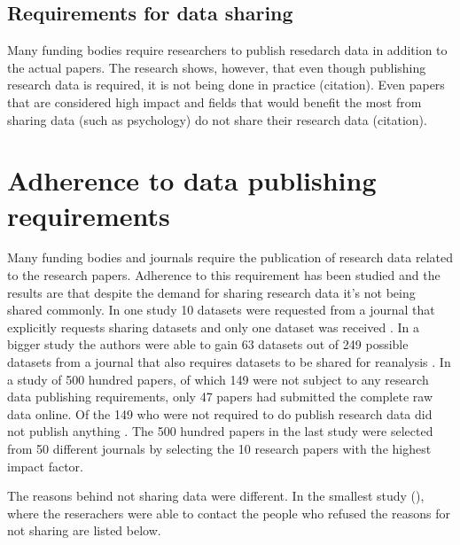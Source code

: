 \subsection{Requirements for data sharing}

Many funding bodies require researchers to publish resedarch data in addition
to the actual papers. The research shows, however, that even though publishing
research data is required, it is not being done in practice (citation). Even
papers that are considered high impact and fields that would benefit the most
from sharing data (such as psychology) do not share their research data
(citation).

\section{Adherence to data publishing requirements}

Many funding bodies and journals require the publication of research data
related to the research papers. Adherence to this requirement has been studied
and the results are that despite the demand for sharing research data it's not
being shared commonly. In one study 10 datasets were requested from a journal
that explicitly requests sharing datasets and only one dataset was received
\cite{savage2009empirical}. In a bigger study the authors were able to gain
63 datasets out of 249 possible datasets from a journal that also requires
datasets to be shared for reanalysis \cite{wicherts2006poor}. In a study of
500 hundred papers, of which 149 were not subject to any research data
publishing requirements, only 47 papers had submitted the complete raw data
online. Of the 149 who were not required to do publish research data did not
publish anything \cite{alsheikh2011public}. The 500 hundred papers in the last
study were selected from 50 different journals by selecting the 10 research
papers with the highest impact factor.

The reasons behind not sharing data were different. In the smallest study (\cite{savage2009empirical}),
where the reserachers were able to contact the people who refused the reasons
for not sharing are listed below.

